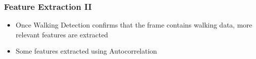 \documentclass{beamer}
\begin{document}
\begin{frame}
\frametitle{Feature Extraction II}
	\begin{itemize}
		\item Once Walking Detection confirms that the frame contains walking data, more relevant features are extracted
		\linebreak
		
		\item Some features extracted using Autocorrelation
		
		
%		



	\end{itemize}
\end{frame}

\end{document}
